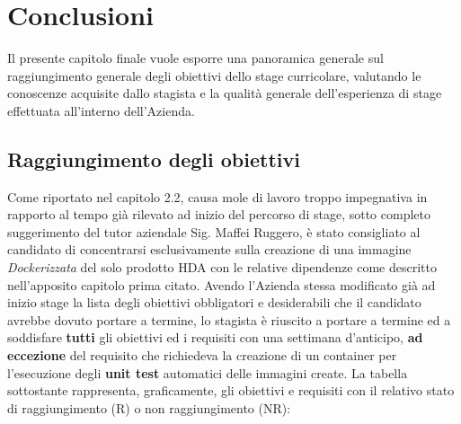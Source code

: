 
\chapter{Conclusioni}
\label{cap:conclusioni}
Il presente capitolo finale vuole esporre una panoramica generale sul raggiungimento generale degli obiettivi dello stage curricolare, valutando le conoscenze acquisite dallo stagista e la qualità generale dell'esperienza di stage effettuata all'interno dell'Azienda.
\section{Raggiungimento degli obiettivi}
Come riportato nel capitolo 2.2, causa mole di lavoro troppo impegnativa in rapporto al tempo già rilevato ad inizio del percorso di stage, sotto completo suggerimento del tutor aziendale Sig. Maffei Ruggero, è stato consigliato al candidato di concentrarsi esclusivamente sulla creazione di una immagine \textit{Dockerizzata} del solo prodotto HDA con le relative dipendenze come descritto nell'apposito capitolo prima citato.
Avendo l'Azienda stessa modificato già ad inizio stage la lista degli obiettivi obbligatori e desiderabili che il candidato avrebbe dovuto portare a termine, lo stagista è riuscito a portare a termine ed a soddisfare \textbf{tutti} gli obiettivi ed i requisiti con una settimana d'anticipo, \textbf{ad eccezione} del requisito che richiedeva la creazione di un container per l'esecuzione degli \textbf{unit test} automatici delle immagini create. La tabella sottostante rappresenta, graficamente, gli obiettivi e requisiti con il relativo stato di raggiungimento (R) o non raggiungimento (NR):
\newpage
